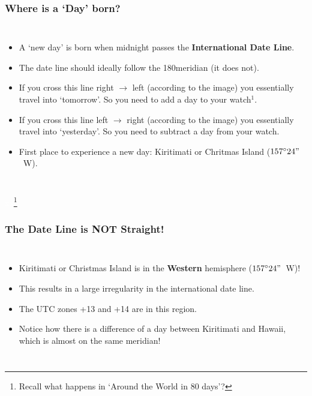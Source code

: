 \def\fn{\tiny Recall what happens in `Around the World in 80 days'?}
\begin{frame}
\frametitle{Where is a `Day' born?}
\begin{columns}
\begin{itemize}
\item A `new day' is born when midnight passes the \textbf{International Date Line}.
\item The date line should ideally follow the 180\degree meridian (it does not).
\item If you cross this line right $\rightarrow$ left (according to the image) you essentially travel into `tomorrow'. So you need to add a day to your watch$^\text{1}$.
\item If you cross this line left $\rightarrow$ right (according to the image) you essentially travel into `yesterday'. So you need to subtract a day from your watch.
\item First place to experience a new day: Kiritimati or Chritmas Island ($157^\circ24"$~\textcolor{myRed}{W}).
\end{itemize}
\end{columns}
\textcolor{white}{xx\footnote{\fn}}
\end{frame}

\begin{frame}
\frametitle{The Date Line is NOT Straight!}
\begin{columns}
\begin{itemize}\small
\item Kiritimati or Christmas Island is in the \textbf{Western} hemisphere ($157^\circ24"$~\textcolor{myRed}{W})!
\item This results in a large irregularity in the international date line.
\item The UTC zones +13 and +14 are in this region.
\item Notice how there is a difference of a day between Kiritimati and Hawaii, which is almost on the same meridian!
\end{itemize}
\end{columns}
\end{frame}

